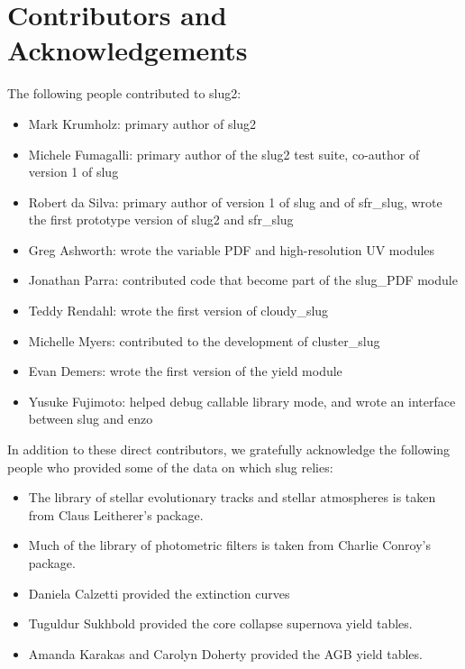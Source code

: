 \documentclass[letterpaper,10pt,english]{sphinxmanual}
\begin{document}
\chapter{Contributors and Acknowledgements}
\label{\detokenize{acknowledgements::doc}}\label{\detokenize{acknowledgements:contributors-and-acknowledgements}}
The following people contributed to slug2:
\begin{itemize}
\item {} 
Mark Krumholz: primary author of slug2

\item {} 
Michele Fumagalli: primary author of the slug2 test suite, co-author of version 1 of slug

\item {} 
Robert da Silva: primary author of version 1 of slug and of sfr\_slug, wrote the first prototype version of slug2 and sfr\_slug

\item {} 
Greg Ashworth: wrote the variable PDF and high-resolution UV modules

\item {} 
Jonathan Parra: contributed code that become part of the slug\_PDF module

\item {} 
Teddy Rendahl: wrote the first version of cloudy\_slug

\item {} 
Michelle Myers: contributed to the development of cluster\_slug

\item {} 
Evan Demers: wrote the first version of the yield module

\item {} 
Yusuke Fujimoto: helped debug callable library mode, and wrote an interface between slug and enzo

\end{itemize}

In addition to these direct contributors, we gratefully acknowledge the following people who provided some of the data on which slug relies:
\begin{itemize}
\item {} 
The library of stellar evolutionary tracks and stellar atmospheres is taken from Claus Leitherer’s  package.

\item {} 
Much of the library of photometric filters is taken from Charlie Conroy’s  package.

\item {} 
Daniela Calzetti provided the extinction curves

\item {} 
Tuguldur Sukhbold provided the core collapse supernova yield tables.

\item {} 
Amanda Karakas and Carolyn Doherty provided the AGB yield tables.

\end{itemize}
\end{document}
